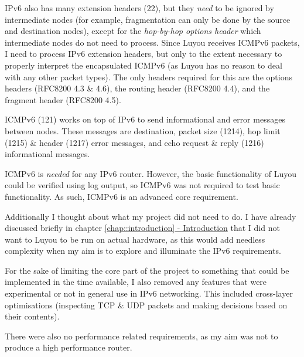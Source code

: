 \documentclass[12pt,a4paper,twoside,openany]{report}
\begin{document}
IPv6 also has many extension headers (22), but they \textit{need} to be ignored by intermediate nodes (for example, fragmentation can only be done by the source and destination nodes), except for the \textit{hop-by-hop options header} which intermediate nodes do not need to process\cite{ipv6_rfc}. Since Luyou receives ICMPv6 packets, I need to process IPv6 extension headers, but only to the extent necessary to properly interpret the encapsulated ICMPv6 (as Luyou has no reason to deal with any other packet types).  The only headers required for this are the options headers (RFC8200 4.3 \& 4.6\cite{ipv6_rfc}), the routing header (RFC8200 4.4\cite{ipv6_rfc}), and the fragment header (RFC8200 4.5\cite{ipv6_rfc}).

\bigskip

ICMPv6 (121) works on top of IPv6 to send informational and error messages between nodes.  These messages are destination, packet size (1214), hop limit (1215) \& header (1217) error messages, and echo request \& reply (1216) informational messages. 

ICMPv6 is \textit{needed} for any IPv6 router.  However, the basic functionality of Luyou could be verified using log output, so ICMPv6 was not required to test basic functionality. As such, ICMPv6 is an advanced core requirement.

\bigskip

Additionally I thought about what my project did not need to do. I have already discussed briefly in chapter \ref{chap::introduction}\hyperref[chap::introduction]{ - Introduction} that I did not want to Luyou to be run on actual hardware, as this would add needless complexity when my aim is to explore and illuminate the IPv6 requirements. 

For the sake of limiting the core part of the project to something that could be implemented in the time available, I also removed any features that were experimental or not in general use in IPv6 networking.  This included cross-layer optimisations (inspecting TCP \& UDP packets and making decisions based on their contents).

There were also no performance related requirements, as my aim was not to produce a high performance router.

\bigskip
\end{document}
